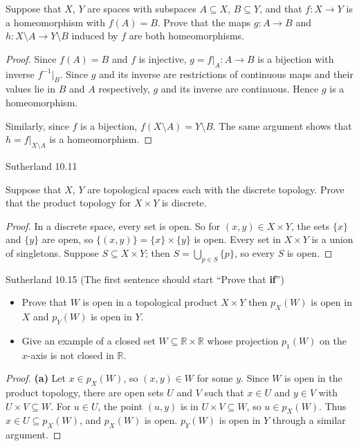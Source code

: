 \documentclass[minion]{homework}
\newcommand{\Reals}{\ensuremath{\mathbb R}}%
\begin{document}
\begin{problems}
Suppose that $X$, $Y$ are spaces with subspaces $A \subseteq X$, $B \subseteq Y$, and that $f : X \to Y$ is a homeomorphism with $f(A) = B$. Prove that the maps $g : A \to B$ and $h : X \setminus A \to Y \setminus B$ induced by $f$ are both homeomorphisms.

\begin{proof}
Since $f(A) = B$ and $f$ is injective, $g = f|_A : A \to B$ is a bijection with inverse $f^{-1}|_B$. Since $g$ and its inverse are restrictions of continuous maps and their values lie in $B$ and $A$ respectively, $g$ and its inverse are continuous. Hence $g$ is a homeomorphism.

Similarly, since $f$ is a bijection, $f(X \setminus A) = Y \setminus B$. The same argument shows that $h = f|_{X \setminus A}$ is a homeomorphism.
\end{proof}

\problem Sutherland 10.11

Suppose that $X$, $Y$ are topological spaces each with the discrete topology. Prove that the product topology for $X \times Y$ is discrete.

\begin{proof}
In a discrete space, every set is open. So for $(x,y) \in X \times Y$, the sets $\{x\}$ and $\{y\}$ are open, so $\{(x,y)\} = \{x\} \times \{y\}$ is open. Every set in $X \times Y$ is a union of singletons. Suppose $S \subseteq X \times Y$; then $S = \bigcup_{p \in S} \{p\}$, so every $S$ is open.
\end{proof}

\problem Sutherland 10.15 (The first sentence should start ``Prove that \textbf{if}'')

\begin{itemize}
  \item[(a)] Prove that $W$ is open in a topological product $X \times Y$ then $p_X(W)$ is open in $X$ and $p_Y(W)$ is open in $Y$.
  \item[(b)] Give an example of a closed set $W \subseteq \Reals \times \Reals$ whose projection $p_1(W)$ on the $x$-axis is not closed in $\Reals$.
\end{itemize}

\begin{proof}
\textbf{(a)} Let $x \in p_X(W)$, so $(x,y) \in W$ for some $y$. Since $W$ is open in the product topology, there are open sets $U$ and $V$ such that $x \in U$ and $y \in V$ with $U \times V \subseteq W$. For $u \in U$, the point $(u,y)$ is in $U \times V \subseteq W$, so $u \in p_X(W)$. Thus $x \in U \subseteq p_X(W)$, and $p_X(W)$ is open. $p_Y(W)$ is open in $Y$ through a similar argument.


\end{proof}
\end{problems}
\end{document}
